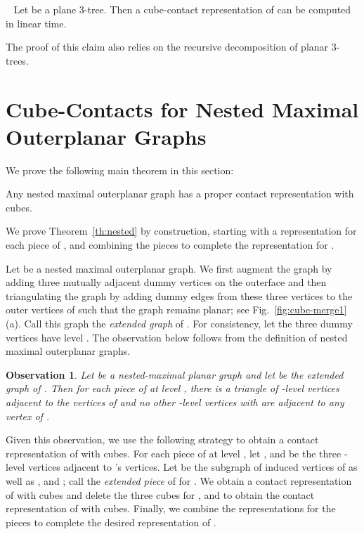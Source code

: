 \documentclass{llncs}
\newtheorem{obs}[lemma]{Observation}
\begin{document}
\begin{theorem}~\cite{BEF+12}
Let  be a plane 3-tree. Then a cube-contact representation of  can be computed in linear
 time.
\end{theorem}

The proof of this claim also relies on the recursive decomposition of
planar 3-trees. 











\section{Cube-Contacts for Nested Maximal Outerplanar Graphs}


We prove the following main theorem in this section:



\begin{theorem}
Any nested maximal outerplanar graph has a proper contact representation with cubes.
\label{th:nested}
\end{theorem}



We prove Theorem~\ref{th:nested} by construction, starting with a representation
 for each piece of , and combining the pieces to complete the
 representation for .



Let  be a nested maximal outerplanar graph. We first augment the graph  by adding
 three mutually adjacent dummy vertices  on the outerface
 and then triangulating the graph by adding dummy edges from these three
 vertices to the outer vertices of  such that the graph remains planar; see
 Fig.~\ref{fig:cube-merge1}(a). Call this graph the \textit{extended graph} of .
 For consistency, let the three dummy vertices have level .
 The observation below follows from the definition of nested maximal outerplanar graphs.


\begin{obs}
	\label{obs:extended} Let  be a nested-maximal planar graph and let  be the
	extended graph of . Then for each piece  of  at level , there is a triangle
	of -level vertices adjacent to the vertices of  and no other -level
	vertices with  are adjacent to any vertex of .
\end{obs}



Given this observation, we use the following strategy to obtain a contact representation of 
 with cubes. For each piece  of  at level , let ,  and  be the three
 -level vertices adjacent to 's vertices. Let  be
 the subgraph of 
 induced vertices of  as well as ,  and
 ; call  the {\em extended
 piece} of  for . We obtain a contact representation of  with cubes and delete
 the three cubes for ,  and  to obtain the contact representation of  with cubes.
 Finally, we combine the representations for the pieces to complete the desired
 representation of .
\end{document}
